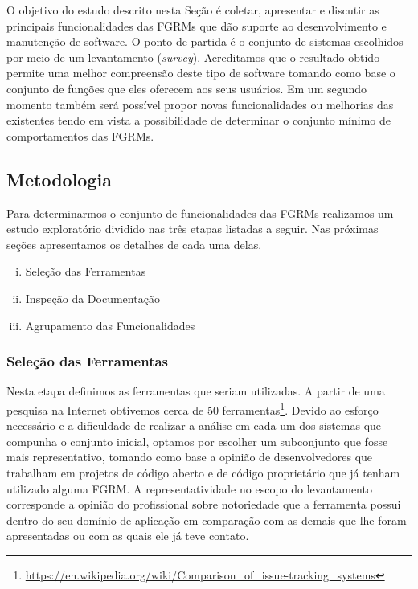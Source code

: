O objetivo do estudo descrito nesta Seção é coletar, apresentar e discutir as
principais funcionalidades das FGRMs que dão suporte ao desenvolvimento e
manutenção de software. O ponto de partida é o conjunto de sistemas escolhidos
por meio de um levantamento (\textit{survey}). Acreditamos que o resultado
obtido permite uma melhor compreensão deste tipo de software tomando como base
o conjunto de funções que eles oferecem aos seus usuários. Em um segundo
momento também será possível propor novas funcionalidades ou melhorias das
existentes tendo em vista a possibilidade de determinar o conjunto mínimo de
comportamentos das FGRMs.

\subsection{Metodologia}\label{subsec:metodologia}

Para determinarmos o conjunto de funcionalidades das FGRMs realizamos um estudo
exploratório dividido nas três etapas listadas a seguir. Nas próximas seções
apresentamos os detalhes de cada uma delas.

\begin{enumerate}[(i)]
	\item Seleção das Ferramentas
	\item Inspeção da Documentação
	\item Agrupamento das Funcionalidades
\end{enumerate}

\subsubsection{Seleção das Ferramentas}\label{subsubsec:selecao-ferramentas}

Nesta etapa definimos as ferramentas que seriam utilizadas. A partir de uma
pesquisa na Internet obtivemos cerca de 50
ferramentas\footnote{\url{https://en.wikipedia.org/wiki/Comparison_of_issue-tracking_systems}}.
Devido ao esforço necessário e a dificuldade de realizar a análise em cada um
dos sistemas que compunha o conjunto inicial, optamos por escolher um
subconjunto que fosse mais representativo, tomando como base a opinião de
desenvolvedores que trabalham em projetos de código aberto e de código
proprietário que já tenham utilizado alguma FGRM\@. A representatividade no
escopo do levantamento corresponde a opinião do profissional sobre notoriedade
que a ferramenta possui dentro do seu domínio de aplicação em comparação com as
demais que lhe foram apresentadas ou com as quais ele já teve contato.


